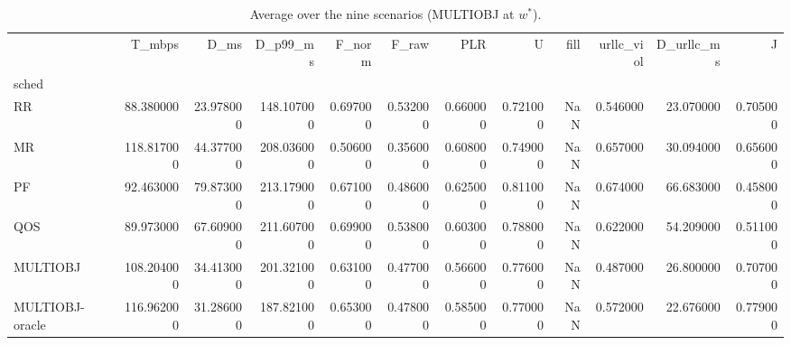 \begin{table}
\caption{Average over the nine scenarios (MULTIOBJ at $w^*$).}
\label{tab:cmp}
\begin{tabular}{lrrrrrrrrrrr}
\toprule
 & T_mbps & D_ms & D_p99_ms & F_norm & F_raw & PLR & U & fill & urllc_viol & D_urllc_ms & J \\
sched &  &  &  &  &  &  &  &  &  &  &  \\
\midrule
RR & 88.380000 & 23.978000 & 148.107000 & 0.697000 & 0.532000 & 0.660000 & 0.721000 & NaN & 0.546000 & 23.070000 & 0.705000 \\
MR & 118.817000 & 44.377000 & 208.036000 & 0.506000 & 0.356000 & 0.608000 & 0.749000 & NaN & 0.657000 & 30.094000 & 0.656000 \\
PF & 92.463000 & 79.873000 & 213.179000 & 0.671000 & 0.486000 & 0.625000 & 0.811000 & NaN & 0.674000 & 66.683000 & 0.458000 \\
QOS & 89.973000 & 67.609000 & 211.607000 & 0.699000 & 0.538000 & 0.603000 & 0.788000 & NaN & 0.622000 & 54.209000 & 0.511000 \\
MULTIOBJ & 108.204000 & 34.413000 & 201.321000 & 0.631000 & 0.477000 & 0.566000 & 0.776000 & NaN & 0.487000 & 26.800000 & 0.707000 \\
MULTIOBJ-oracle & 116.962000 & 31.286000 & 187.821000 & 0.653000 & 0.478000 & 0.585000 & 0.770000 & NaN & 0.572000 & 22.676000 & 0.779000 \\
\bottomrule
\end{tabular}
\end{table}
